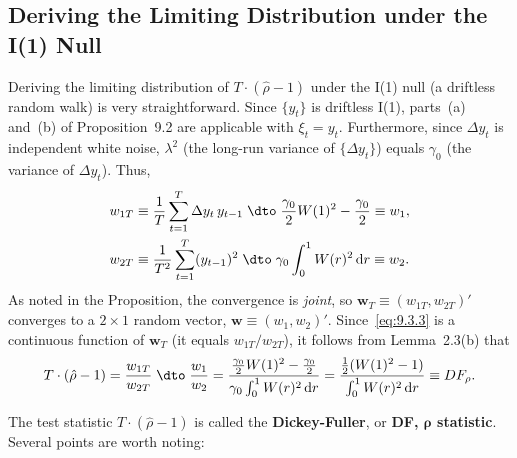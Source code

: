 \subsection*{Deriving the Limiting Distribution under the I(1) Null}

Deriving the limiting distribution of $T \cdot (\hat{\rho} - 1)$ under the I(1) null (a driftless random walk) is very straightforward. Since $\{y_t\}$ is driftless I(1), parts~(a) and~(b) of
Proposition~9.2 are applicable with $\xi_t = y_t$. Furthermore, since $\Delta y_t$ is independent
white noise, $\lambda^2$ (the long-run variance of $\{\Delta y_t\}$) equals $\gamma_0$ (the variance of $\Delta y_t$).
Thus,
\begin{align}
w_{1T} &\equiv \frac{1}{T} \sum_{t=1}^{T} \Delta y_t\, y_{t-1}
\;\dto\; \frac{\gamma_0}{2} W(1)^2 - \frac{\gamma_0}{2} \equiv w_1,
\label{eq:9.3.4} \\
w_{2T} &\equiv \frac{1}{T^2} \sum_{t=1}^{T} (y_{t-1})^2
\;\dto\; \gamma_0 \int_0^1 W(r)^2\,\mathrm{d}r \equiv w_2.
\label{eq:9.3.5}
\end{align}
As noted in the Proposition, the convergence is \emph{joint}, so $\mathbf{w}_T \equiv (w_{1T}, w_{2T})'$ converges
to a $2 \times 1$ random vector, $\mathbf{w} \equiv (w_1, w_2)'$. Since~\eqref{eq:9.3.3} is a
continuous function of $\mathbf{w}_T$ (it equals $w_{1T}/w_{2T}$), it follows from Lemma~2.3(b) that
\begin{equation}
\label{eq:9.3.6}
T \cdot (\hat{\rho} - 1)
= \frac{w_{1T}}{w_{2T}}
\;\dto\; \frac{w_1}{w_2}
= \frac{\frac{\gamma_0}{2} W(1)^2 - \frac{\gamma_0}{2}}{\gamma_0 \int_0^1 W(r)^2\,\mathrm{d}r}
= \frac{\tfrac{1}{2}(W(1)^2 - 1)}{\int_0^1 W(r)^2\,\mathrm{d}r}
\equiv DF_\rho.
\end{equation}

The test statistic $T \cdot (\hat{\rho} - 1)$ is called the \textbf{Dickey-Fuller}, or \textbf{DF, $\bm{\rho}$ statistic}. Several
points are worth noting:

